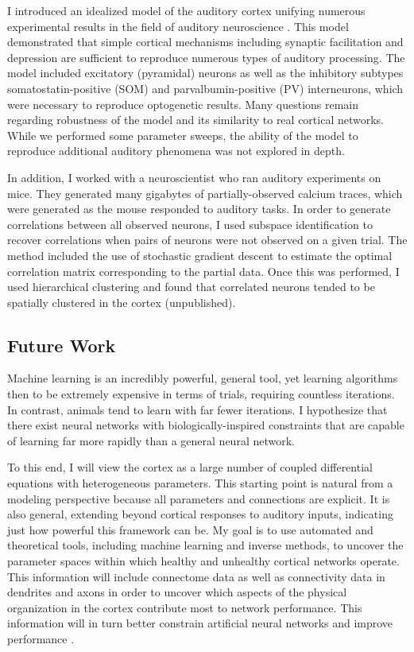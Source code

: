 \documentclass[a4paper,11pt]{article}
\begin{document}
I introduced an idealized model of the auditory cortex unifying numerous experimental results in the field of auditory neuroscience \cite{park2020circuit}. This model demonstrated that simple cortical mechanisms including synaptic facilitation and depression are sufficient to reproduce numerous types of auditory processing. The model included excitatory (pyramidal) neurons as well as the inhibitory subtypes somatostatin-positive (SOM) and parvalbumin-positive (PV) interneurons, which were necessary to reproduce optogenetic results. Many questions remain regarding robustness of the model and its similarity to real cortical networks. While we performed some parameter sweeps, the ability of the model to reproduce additional auditory phenomena was not explored in depth.

In addition, I worked with a neuroscientist who ran auditory experiments on mice. They generated many gigabytes of partially-observed calcium traces, which were generated as the mouse responded to auditory tasks. In order to generate correlations between all observed neurons, I used subspace identification to recover correlations when pairs of neurons were not observed on a given trial. The method included the use of stochastic gradient descent to estimate the optimal correlation matrix corresponding to the partial data. Once this was performed, I used hierarchical clustering and found that correlated neurons tended to be spatially clustered in the cortex (unpublished).

\subsection{Future Work}
Machine learning is an incredibly powerful, general tool, yet learning algorithms then to be extremely expensive in terms of trials, requiring countless iterations. In contrast, animals tend to learn with far fewer iterations. I hypothesize that there exist neural networks with biologically-inspired constraints that are capable of learning far more rapidly than a general neural network.

To this end, I will view the cortex as a large number of coupled differential equations with heterogeneous parameters. This starting point is natural from a modeling perspective because all parameters and connections are explicit. It is also general, extending beyond cortical responses to auditory inputs, indicating just how powerful this framework can be. My goal is to use automated and theoretical tools, including machine learning and inverse methods, to uncover the parameter spaces within which healthy and unhealthy cortical networks operate. This information will include connectome data as well as connectivity data in dendrites and axons in order to uncover which aspects of the physical organization in the cortex contribute most to network performance. This information will in turn better constrain artificial neural networks and improve performance \cite{lee2018training}.
\end{document}
